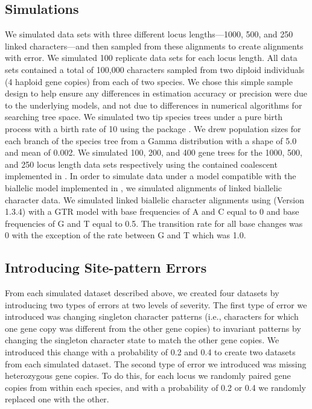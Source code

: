 \subsection{Simulations}
We simulated data sets with three different locus lengths---1000, 500, and 250 
linked characters---and then sampled from these alignments to create alignments 
with  error. We simulated 100 replicate data sets for each locus length. 
All data sets contained a total of 100,000 
characters sampled from two diploid individuals (4 haploid gene copies) from each 
of two species. We chose this simple sample design to help ensure any 
differences in estimation accuracy or precision were due to the underlying 
models, and not due to differences in numerical algorithms for searching tree 
space.  We simulated two tip species trees under a pure birth process with a 
birth rate of 10 using the \python package
\dendropy
\citep[Version 4.40; dev branch commit eb69003;][]{Dendropy}.  
We drew population sizes for each branch of the species tree from a Gamma 
distribution with a shape of 5.0 and mean of 0.002. We simulated 100, 200, and 
400 gene trees for the 1000, 500, and 250 locus length data sets respectively 
using the contained coalescent implemented in \dendropy. In order to 
simulate data under a model compatible with the biallelic model implemented in 
\ecoevolity, we simulated alignments of linked biallelic character data. 
We simulated linked biallelic character alignments using
\seqgen (Version 1.3.4)
\citep{@rambautSeqGenApplicationMonte1997}
with a GTR model with base frequencies of A and C equal to 0 and base 
frequencies of G and T equal to 0.5. The transition rate for all base changes was 
0 with the exception of the rate between G and T which was 1.0. 

\subsection{Introducing Site-pattern Errors}
From each simulated dataset described above, we created four datasets by 
introducing two types of errors at two levels of severity. The first type of 
error we introduced was changing singleton character patterns (i.e., characters 
for which one gene copy was different from the other gene copies) to invariant 
patterns by changing the singleton character state to match the other gene 
copies. We introduced this change with a probability of 0.2 and 0.4 to create 
two datasets from each simulated dataset. The second type of error we introduced 
was missing heterozygous gene copies. To do this, for each locus 
we randomly paired gene copies from within each species, and with a probability 
of 0.2 or 0.4 we randomly replaced one with the other.


